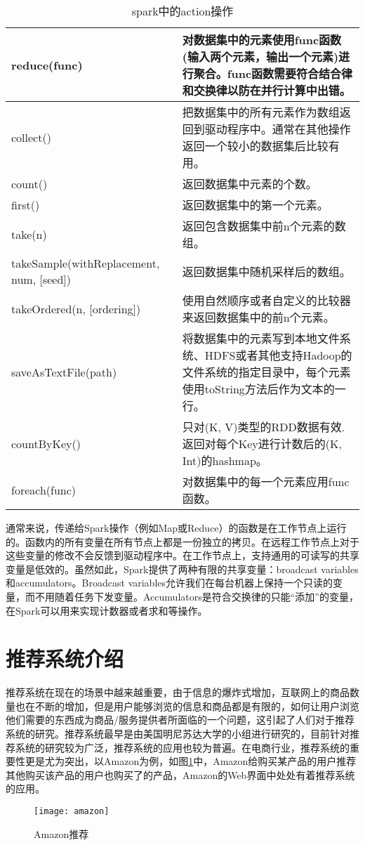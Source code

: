 \begin{table}[htbp]
\centering
\caption{spark中的action操作} \label{spark:action}
\begin{tabular}{|p{5cm}|p{10cm}|}
    \hline
    reduce(func) & 对数据集中的元素使用func函数(输入两个元素，输出一个元素)进行聚合。func函数需要符合结合律和交换律以防在并行计算中出错。\\     \hline
    collect() & 把数据集中的所有元素作为数组返回到驱动程序中。通常在其他操作返回一个较小的数据集后比较有用。\\ \hline
    count() &  返回数据集中元素的个数。\\ \hline
    first() &  返回数据集中的第一个元素。\\ \hline
    take(n) & 返回包含数据集中前n个元素的数组。\\ \hline
    takeSample(withReplacement, num, [seed]) & 返回数据集中随机采样后的数组。\\ \hline
    takeOrdered(n, [ordering]) & 使用自然顺序或者自定义的比较器来返回数据集中的前n个元素。\\ \hline
    saveAsTextFile(path) & 将数据集中的元素写到本地文件系统、HDFS或者其他支持Hadoop的文件系统的指定目录中，每个元素使用toString方法后作为文本的一行。\\ \hline
    countByKey() & 只对(K, V)类型的RDD数据有效. 返回对每个Key进行计数后的(K, Int)的hashmap。\\ \hline
    foreach(func) & 对数据集中的每一个元素应用func函数。\\ \hline
    \hline
\end{tabular}
\end{table}

通常来说，传递给Spark操作（例如Map或Reduce）的函数是在工作节点上运行的。函数内的所有变量在所有节点上都是一份独立的拷贝。在远程工作节点上对于这些变量的修改不会反馈到驱动程序中。在工作节点上，支持通用的可读写的共享变量是低效的。虽然如此，Spark提供了两种有限的共享变量：broadcast variables和accumulators。Broadcast variables允许我们在每台机器上保持一个只读的变量，而不用随着任务下发变量。Accumulators是符合交换律的只能“添加”的变量，在Spark可以用来实现计数器或者求和等操作。

\section{推荐系统介绍}
推荐系统在现在的场景中越来越重要，由于信息的爆炸式增加，互联网上的商品数量也在不断的增加，但是用户能够浏览的信息和商品都是有限的，如何让用户浏览他们需要的东西成为商品/服务提供者所面临的一个问题，这引起了人们对于推荐系统的研究。推荐系统最早是由美国明尼苏达大学的小组进行研究的，目前针对推荐系统的研究较为广泛，推荐系统的应用也较为普遍。在电商行业，推荐系统的重要性更是尤为突出，以Amazon为例，如图\ref{fig:amazon}中，Amazon给购买某产品的用户推荐其他购买该产品的用户也购买了的产品，Amazon的Web界面中处处有着推荐系统的应用。
\begin{figure}[ht]
\centering
\texttt{[image: amazon]}
\caption{Amazon推荐}\label{fig:amazon}
\end{figure}

